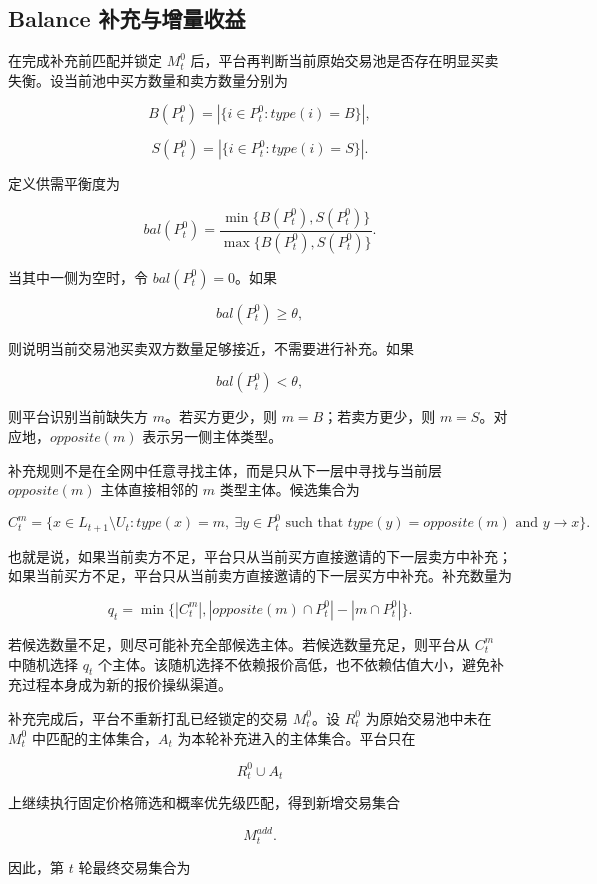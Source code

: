 \documentclass[UTF8,11pt]{ctexart}
\begin{document}
\subsection{Balance 补充与增量收益}

在完成补充前匹配并锁定 \(M_t^0\) 后，平台再判断当前原始交易池是否存在明显买卖失衡。设当前池中买方数量和卖方数量分别为

\[
    B(P_t^0)=|\{i\in P_t^0:type(i)=B\}|,
\]

\[
    S(P_t^0)=|\{i\in P_t^0:type(i)=S\}|.
\]

定义供需平衡度为

\[
    bal(P_t^0)=
    \frac{\min\{B(P_t^0),S(P_t^0)\}}
    {\max\{B(P_t^0),S(P_t^0)\}}.
\]

当其中一侧为空时，令 \(bal(P_t^0)=0\)。如果

\[
    bal(P_t^0)\ge \theta,
\]

则说明当前交易池买卖双方数量足够接近，不需要进行补充。如果

\[
    bal(P_t^0)<\theta,
\]

则平台识别当前缺失方 \(m\)。若买方更少，则 \(m=B\)；若卖方更少，则 \(m=S\)。对应地，\(opposite(m)\) 表示另一侧主体类型。

补充规则不是在全网中任意寻找主体，而是只从下一层中寻找与当前层 \(opposite(m)\) 主体直接相邻的 \(m\) 类型主体。候选集合为

\[
    C_t^m=
    \{x\in L_{t+1}\setminus U_t:
    type(x)=m,\
    \exists y\in P_t^0
    \text{ such that }
    type(y)=opposite(m)
    \text{ and }
    y\to x
    \}.
\]

也就是说，如果当前卖方不足，平台只从当前买方直接邀请的下一层卖方中补充；如果当前买方不足，平台只从当前卖方直接邀请的下一层买方中补充。补充数量为

\[
    q_t=
    \min\{
    |C_t^m|,
    |opposite(m)\cap P_t^0|-|m\cap P_t^0|
    \}.
\]

若候选数量不足，则尽可能补充全部候选主体。若候选数量充足，则平台从 \(C_t^m\) 中随机选择 \(q_t\) 个主体。该随机选择不依赖报价高低，也不依赖估值大小，避免补充过程本身成为新的报价操纵渠道。

补充完成后，平台不重新打乱已经锁定的交易 \(M_t^0\)。设 \(R_t^0\) 为原始交易池中未在 \(M_t^0\) 中匹配的主体集合，\(A_t\) 为本轮补充进入的主体集合。平台只在

\[
    R_t^0\cup A_t
\]

上继续执行固定价格筛选和概率优先级匹配，得到新增交易集合

\[
    M_t^{add}.
\]

因此，第 \(t\) 轮最终交易集合为
\end{document}
